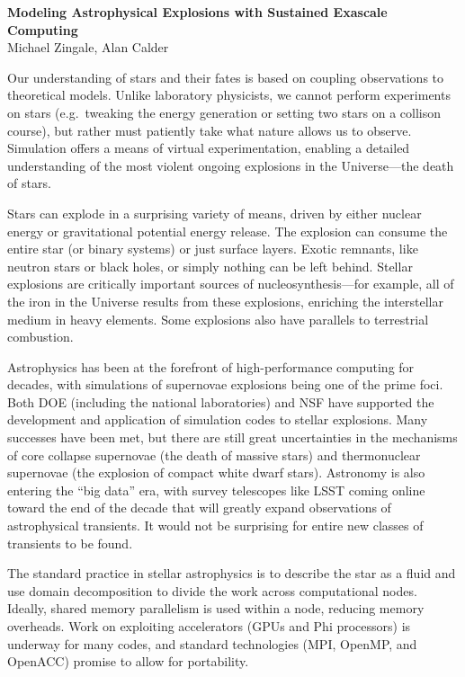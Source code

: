 \documentclass[11pt]{article}
\begin{document}
\begin{center}
{\sffamily \bfseries \large Modeling Astrophysical Explosions with Sustained Exascale Computing} \\
Michael Zingale\footnotemark[1], Alan Calder\footnotemark[1]
\end{center}


Our understanding of stars and their fates is based on coupling
observations to theoretical models.  Unlike laboratory physicists, we
cannot perform experiments on stars (e.g.\ tweaking the energy
generation or setting two stars on a collison course), but rather must
patiently take what nature allows us to observe.  Simulation offers a means
of virtual experimentation, enabling a detailed understanding of the
most violent ongoing explosions in the Universe---the death of stars.

Stars can explode in a surprising variety of means, driven by either
nuclear energy or gravitational potential energy release.  The
explosion can consume the entire star (or binary systems) or just
surface layers.  Exotic remnants, like neutron stars or black holes, or
simply nothing can be left behind.  Stellar explosions are critically
important sources of nucleosynthesis---for example, all of the iron in
the Universe results from these explosions, enriching the interstellar
medium in heavy elements.  Some explosions also have parallels to
terrestrial combustion.

Astrophysics has been at the forefront of high-performance computing
for decades, with simulations of supernovae explosions being one of
the prime foci.  Both DOE (including the national laboratories) and
NSF have supported the development and application of simulation codes
to stellar explosions.  Many successes have been met, but there are
still great uncertainties in the mechanisms of core collapse
supernovae (the death of massive stars) and thermonuclear supernovae
(the explosion of compact white dwarf stars).  Astronomy is also
entering the ``big data'' era, with survey telescopes like LSST coming
online toward the end of the decade that will greatly expand
observations of astrophysical transients.  It would not be surprising
for entire new classes of transients to be found.

The standard practice in stellar astrophysics is to describe the star
as a fluid and use domain decomposition to divide the work across
computational nodes.  Ideally, shared memory parallelism is used
within a node, reducing memory overheads.  Work on exploiting
accelerators (GPUs and Phi processors) is underway for many codes, and
standard technologies (MPI, OpenMP, and OpenACC) promise to allow for
portability.
\end{document}
